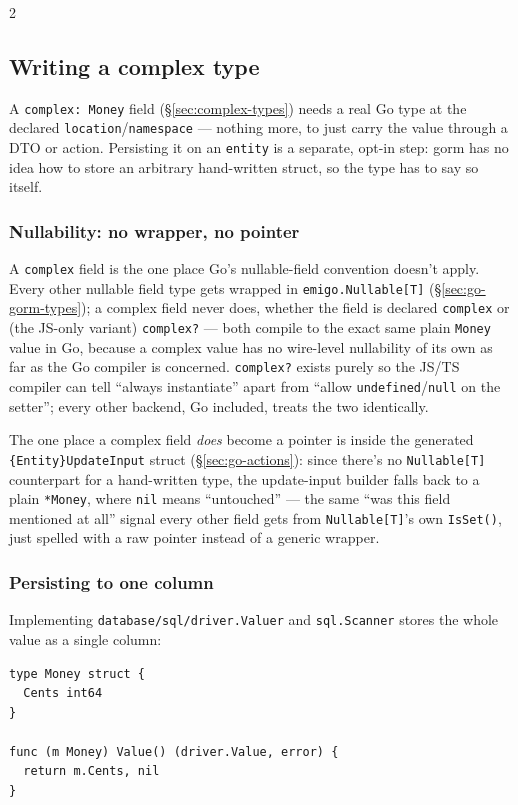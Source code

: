 \begin{multicols}{2}
\subsection{Writing a complex type}
\label{sec:go-complex}
A \texttt{complex: Money} field (\S\ref{sec:complex-types}) needs a real
Go type at the declared \texttt{location}/\texttt{namespace} --- nothing
more, to just carry the value through a DTO or action. Persisting it on
an \texttt{entity} is a separate, opt-in step: gorm has no idea how to
store an arbitrary hand-written struct, so the type has to say so itself.

\subsubsection{Nullability: no wrapper, no pointer}
A \texttt{complex} field is the one place Go's nullable-field convention
doesn't apply. Every other nullable field type gets wrapped in
\texttt{emigo.Nullable[T]} (\S\ref{sec:go-gorm-types}); a complex field
never does, whether the field is declared \texttt{complex} or (the
JS-only variant) \texttt{complex?} --- both compile to the exact same
plain \texttt{Money} value in Go, because a complex value has no
wire-level nullability of its own as far as the Go compiler is concerned.
\texttt{complex?} exists purely so the JS/TS compiler can tell ``always
instantiate'' apart from ``allow \texttt{undefined}/\texttt{null} on the
setter''; every other backend, Go included, treats the two identically.

The one place a complex field \emph{does} become a pointer is inside the
generated \texttt{\{Entity\}UpdateInput} struct (\S\ref{sec:go-actions}):
since there's no \texttt{Nullable[T]} counterpart for a hand-written
type, the update-input builder falls back to a plain \texttt{*Money},
where \texttt{nil} means ``untouched'' --- the same ``was this field
mentioned at all'' signal every other field gets from
\texttt{Nullable[T]}'s own \texttt{IsSet()}, just spelled with a raw
pointer instead of a generic wrapper.

\subsubsection{Persisting to one column}
Implementing \texttt{database/sql/driver.Valuer} and \texttt{sql.Scanner}
stores the whole value as a single column:
\begin{lstlisting}
type Money struct {
  Cents int64
}

func (m Money) Value() (driver.Value, error) {
  return m.Cents, nil
}


\end{lstlisting}
\end{multicols}
